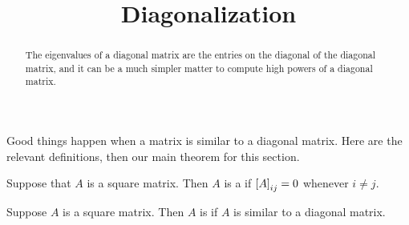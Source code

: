 \documentclass{ximera}
\title{Diagonalization}
\begin{document}
\begin{abstract}
  The eigenvalues of a diagonal matrix are the entries on the diagonal
  of the diagonal matrix, and it can be a much simpler matter to
  compute high powers of a diagonal matrix.
\end{abstract}
\maketitle

Good things happen when a matrix is similar to a diagonal matrix.
Here are the relevant definitions, then our main theorem for this
section.

\begin{definition}
  Suppose that $A$ is a square matrix.  Then $A$ is a  if $\left\lbrack A\right\rbrack_{ij}=0$ whenever $i\neq j$.
\end{definition}

\begin{definition}
  Suppose $A$ is a square matrix.  Then $A$ is  if
  $A$ is similar to a diagonal matrix.
\end{definition}
\end{document}
